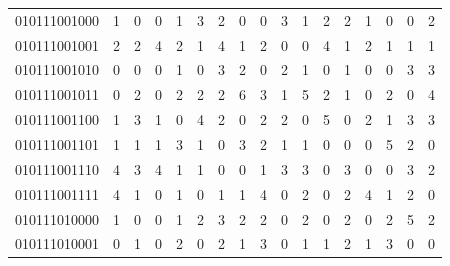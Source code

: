 \documentclass[10pt,a4paper]{article}
\begin{document}
\begin{longtable}{ |c|c|c|c|c|c|c|c|c|c|c|c|c|c|c|c|c| }
    010111001000              & 1                            & 0                                & 0                            & 1                              & 3   & 2   & 0   & 0   & 3   & 1   & 2   & 2   & 1   & 0   & 0   & 2   \\
    010111001001              & 2                            & 2                                & 4                            & 2                              & 1   & 4   & 1   & 2   & 0   & 0   & 4   & 1   & 2   & 1   & 1   & 1   \\
    010111001010              & 0                            & 0                                & 0                            & 1                              & 0   & 3   & 2   & 0   & 2   & 1   & 0   & 1   & 0   & 0   & 3   & 3   \\
    010111001011              & 0                            & 2                                & 0                            & 2                              & 2   & 2   & 6   & 3   & 1   & 5   & 2   & 1   & 0   & 2   & 0   & 4   \\
    010111001100              & 1                            & 3                                & 1                            & 0                              & 4   & 2   & 0   & 2   & 2   & 0   & 5   & 0   & 2   & 1   & 3   & 3   \\
    010111001101              & 1                            & 1                                & 1                            & 3                              & 1   & 0   & 3   & 2   & 1   & 1   & 0   & 0   & 0   & 5   & 2   & 0   \\
    010111001110              & 4                            & 3                                & 4                            & 1                              & 1   & 0   & 0   & 1   & 3   & 3   & 0   & 3   & 0   & 0   & 3   & 2   \\
    010111001111              & 4                            & 1                                & 0                            & 1                              & 0   & 1   & 1   & 4   & 0   & 2   & 0   & 2   & 4   & 1   & 2   & 0   \\
    010111010000              & 1                            & 0                                & 0                            & 1                              & 2   & 3   & 2   & 2   & 0   & 2   & 0   & 2   & 0   & 2   & 5   & 2   \\
    010111010001              & 0                            & 1                                & 0                            & 2                              & 0   & 2   & 1   & 3   & 0   & 1   & 1   & 2   & 1   & 3   & 0   & 0   \\

\end{longtable}
\end{document}
